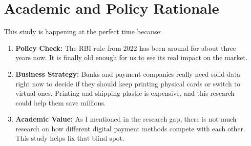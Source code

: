 \section{Academic and Policy Rationale}

This study is happening at the perfect time because:

\begin{enumerate}
    \item \textbf{Policy Check:} The RBI rule from 2022 has been around for about three years now. It is finally old enough for us to see its real impact on the market.
    \item \textbf{Business Strategy:} Banks and payment companies really need solid data right now to decide if they should keep printing physical cards or switch to virtual ones. Printing and shipping plastic is expensive, and this research could help them save millions.
    \item \textbf{Academic Value:} As I mentioned in the research gap, there is not much research on how different digital payment methods compete with each other. This study helps fix that blind spot.
\end{enumerate}